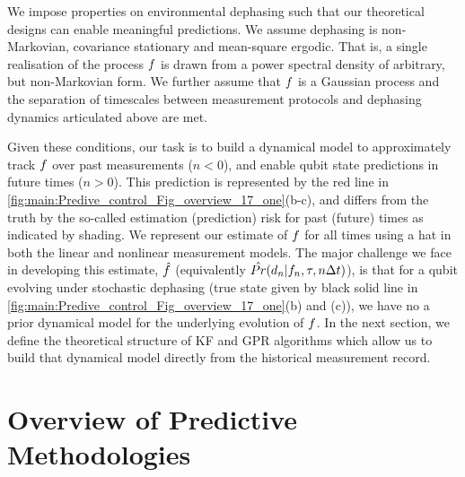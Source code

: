 We impose properties on environmental dephasing such that our theoretical designs can enable meaningful predictions. We assume dephasing is non-Markovian, covariance stationary and mean-square ergodic.  That is, a single realisation of the process $f$ is drawn from a power spectral density of arbitrary, but non-Markovian form. We further assume that $f$ is a Gaussian process and the separation of timescales between measurement protocols and dephasing dynamics articulated above are met.

Given these conditions, our task is to build a dynamical model to approximately track $f$ over past measurements ($n<0$), and enable qubit state predictions in future times ($n>0$).  This prediction is represented by the red line in \cref{fig:main:Predive_control_Fig_overview_17_one}(b-c), and differs from the truth by the so-called estimation (prediction) risk for past (future) times as indicated by shading.  We represent our estimate of $f$ for all times using a hat in both the linear and nonlinear measurement models.  The major challenge we face in developing this estimate, $\hat{f}$ (equivalently $\hat{Pr}(d_n | f_n, \tau, n\Delta t)$), is that for a qubit evolving under stochastic dephasing (true state given by black solid line in \cref{fig:main:Predive_control_Fig_overview_17_one}(b) and (c)), we have no a prior dynamical model for the underlying evolution of $f$.  In the next section, we define the theoretical structure of KF and GPR algorithms which allow us to build that dynamical model directly from the historical measurement record. 




\section{Overview of Predictive Methodologies \label{sec:main:OverviewofPredictive Methodologies}}

